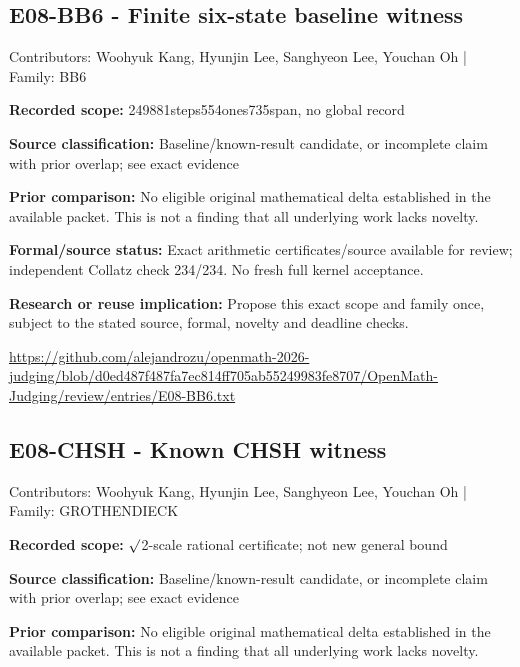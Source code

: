 \documentclass[11pt,a4paper]{article}
\begin{document}
\begin{samepage}
\subsection{E08-BB6  -  Finite six-state baseline witness}
{\small Contributors: Woohyuk Kang, Hyunjin Lee, Sanghyeon Lee, Youchan Oh | Family: BB6\par}

\textbf{Recorded scope:} 249881steps554ones735span, no global record

\end{samepage}
\textbf{Source classification:} Baseline/known-result candidate, or incomplete claim with prior overlap; see exact evidence

\textbf{Prior comparison:} No eligible original mathematical delta established in the available packet. This is not a finding that all underlying work lacks novelty.

\textbf{Formal/source status:} Exact arithmetic certificates/source available for review; independent Collatz check 234/234. No fresh full kernel acceptance.

\textbf{Research or reuse implication:} Propose this exact scope and family once, subject to the stated source, formal, novelty and deadline checks.

{\small \url{https://github.com/alejandrozu/openmath-2026-judging/blob/d0ed487f487fa7ec814ff705ab55249983fe8707/OpenMath-Judging/review/entries/E08-BB6.txt}\par}

\begin{samepage}
\subsection{E08-CHSH  -  Known CHSH witness}
{\small Contributors: Woohyuk Kang, Hyunjin Lee, Sanghyeon Lee, Youchan Oh | Family: GROTHENDIECK\par}

\textbf{Recorded scope:} \ensuremath{\surd}2-scale rational certificate; not new general bound

\end{samepage}
\textbf{Source classification:} Baseline/known-result candidate, or incomplete claim with prior overlap; see exact evidence

\textbf{Prior comparison:} No eligible original mathematical delta established in the available packet. This is not a finding that all underlying work lacks novelty.
\end{document}
